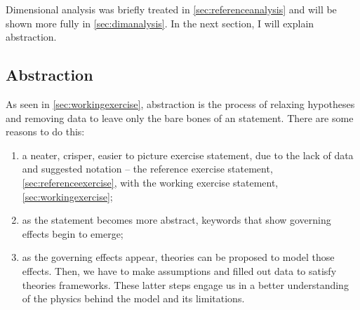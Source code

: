 Dimensional analysis was briefly treated in \cref{sec:referenceanalysis} and will be shown more fully in \cref{sec:dimanalysis}. In the next section, I will explain abstraction.


\subsection{Abstraction}
%
As seen in \cref{sec:workingexercise},
%
abstraction is the process of relaxing hypotheses and removing data to leave only the bare bones of an statement. There are some reasons to do this:
%
\begin{enumerate}
%
\item a neater, crisper, easier to picture exercise statement, due to the lack of data and suggested notation -- \confer the reference exercise statement, \cref{sec:referenceexercise}, with the working exercise statement, \cref{sec:workingexercise};
%
\item as the statement becomes more abstract, keywords that show governing effects begin to emerge;
%
\item as the governing effects appear, theories can be proposed to model those effects. Then, we have to make assumptions and filled out data to satisfy theories frameworks. These latter steps engage us in a better understanding of the physics behind the model and its limitations.
%
\end{enumerate}

